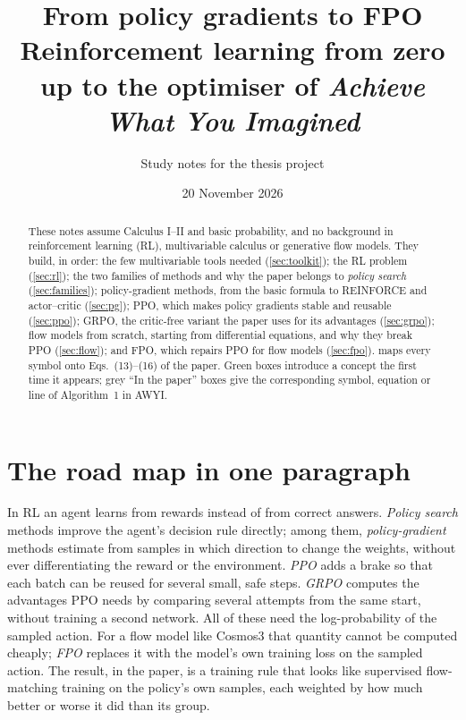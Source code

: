 \documentclass[11pt,a4paper]{article}
\title{\textbf{From policy gradients to FPO}\\[2pt]
\large Reinforcement learning from zero up to the optimiser of \emph{Achieve What You Imagined}}
\author{\normalsize Study notes for the thesis project}
\date{20 November 2026}
\begin{document}
\maketitle

\begin{abstract}
These notes assume Calculus I--II and basic probability, and no background in reinforcement learning (RL), multivariable calculus or generative flow models. They build, in order: the few multivariable tools needed (\cref{sec:toolkit}); the RL problem (\cref{sec:rl}); the two families of methods and why the paper belongs to \emph{policy search} (\cref{sec:families}); policy-gradient methods, from the basic formula to REINFORCE and actor--critic (\cref{sec:pg}); PPO, which makes policy gradients stable and reusable (\cref{sec:ppo}); GRPO, the critic-free variant the paper uses for its advantages (\cref{sec:grpo}); flow models from scratch, starting from differential equations, and why they break PPO (\cref{sec:flow}); and FPO, which repairs PPO for flow models (\cref{sec:fpo}).  maps every symbol onto Eqs.~(13)--(16) of the paper. Green boxes introduce a concept the first time it appears; grey ``In the paper'' boxes give the corresponding symbol, equation or line of Algorithm~1 in AWYI.
\end{abstract}

\tableofcontents

\section*{The road map in one paragraph}
In RL an agent learns from rewards instead of from correct answers. \emph{Policy search} methods improve the agent's decision rule directly; among them, \emph{policy-gradient} methods estimate from samples in which direction to change the weights, without ever differentiating the reward or the environment. \emph{PPO} adds a brake so that each batch can be reused for several small, safe steps. \emph{GRPO} computes the advantages PPO needs by comparing several attempts from the same start, without training a second network. All of these need the log-probability of the sampled action. For a flow model like Cosmos3 that quantity cannot be computed cheaply; \emph{FPO} replaces it with the model's own training loss on the sampled action. The result, in the paper, is a training rule that looks like supervised flow-matching training on the policy's own samples, each weighted by how much better or worse it did than its group.
\end{document}
